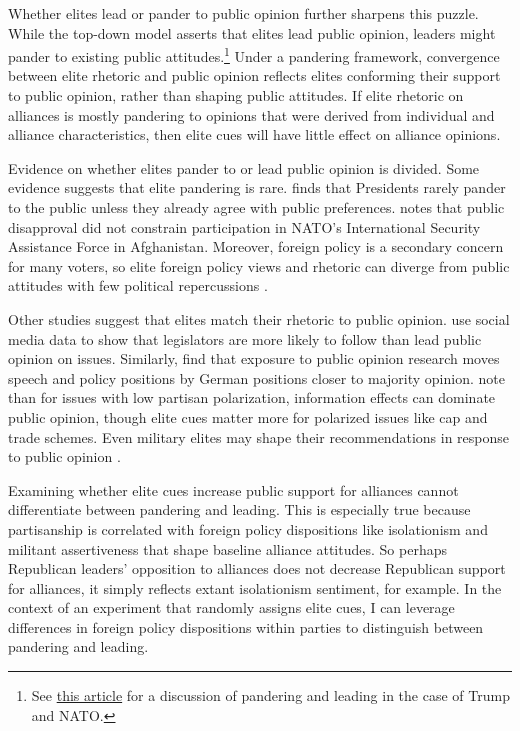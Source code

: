\documentclass[12pt]{article}
\begin{document}
Whether elites lead or pander to public opinion further sharpens this puzzle. 
While the top-down model asserts that elites lead public opinion, leaders might pander to existing public attitudes.\footnote{See \href{https://fivethirtyeight.com/features/is-trump-fueling-republicans-concerns-about-nato-or-echoing-them/}{this article} for a discussion of pandering and leading in the case of Trump and NATO.}
Under a pandering framework, convergence between elite rhetoric and public opinion reflects elites conforming their support to public opinion, rather than shaping public attitudes. 
If elite rhetoric on alliances is mostly pandering to opinions that were derived from individual and alliance characteristics, then elite cues will have little effect on alliance opinions.


Evidence on whether elites pander to or lead public opinion is divided.
Some evidence suggests that elite pandering is rare. 
\citet{Canes-Wrone2006} finds that Presidents rarely pander to the public unless they already agree with public preferences.
\citet{Kreps2010} notes that public disapproval did not constrain participation in NATO's International Security Assistance Force in Afghanistan. 
Moreover, foreign policy is a secondary concern for many voters, so elite foreign policy views and rhetoric can diverge from public attitudes with few political repercussions \citep{BusbyMonten2012}. 


Other studies suggest that elites match their rhetoric to public opinion. 
\citet{Barberaetal2019} use social media data to show that legislators are more likely to follow than lead public opinion on issues. 
Similarly, \citet{HagerHilbig2020} find that exposure to public opinion research moves speech and policy positions by German positions closer to majority opinion. 
\citet{GuisingerSaunders2017} note than for issues with low partisan polarization, information effects can dominate public opinion, though elite cues matter more for polarized issues like cap and trade schemes. 
Even military elites may shape their recommendations in response to public opinion \citep{LinGreenberg2021}. 



Examining whether elite cues increase public support for alliances cannot differentiate between pandering and leading. 
This is especially true because partisanship is correlated with foreign policy dispositions like isolationism and militant assertiveness that shape baseline alliance attitudes. 
So perhaps Republican leaders' opposition to alliances does not decrease Republican support for alliances, it simply reflects extant isolationism sentiment, for example. 
In the context of an experiment that randomly assigns elite cues, I can leverage differences in foreign policy dispositions within parties to distinguish between pandering and leading. 
\end{document}
